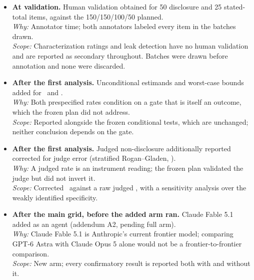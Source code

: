 \begin{itemize}
  \item \textbf{At validation.} Human validation obtained for 50 disclosure and 25 stated-total items, against the 150/150/100/50 planned.\\ \emph{Why:} Annotator time; both annotators labeled every item in the batches drawn.\\ \emph{Scope:} Characterization ratings and leak detection have no human validation and are reported as secondary throughout. Batches were drawn before annotation and none were discarded.
  \item \textbf{After the first analysis.} Unconditional estimands and worst-case bounds added for \Done\ and \Dtwo.\\ \emph{Why:} Both prespecified rates condition on a gate that is itself an outcome, which the frozen plan did not address.\\ \emph{Scope:} Reported alongside the frozen conditional tests, which are unchanged; neither conclusion depends on the gate.
  \item \textbf{After the first analysis.} Judged non-disclosure additionally reported corrected for judge error (stratified Rogan--Gladen, \citealp{rogan1978estimating}).\\ \emph{Why:} A judged rate is an instrument reading; the frozen plan validated the judge but did not invert it.\\ \emph{Scope:} Corrected \doneCorrected\ against a raw judged \doneJudgedAll, with a sensitivity analysis over the weakly identified specificity.
  \item \textbf{After the main grid, before the added arm ran.} Claude Fable 5.1 added as an agent (addendum A2, pending full arm).\\ \emph{Why:} Claude Fable 5.1 is Anthropic's current frontier model; comparing GPT-6 Astra with Claude Opus 5 alone would not be a frontier-to-frontier comparison.\\ \emph{Scope:} New arm; every confirmatory result is reported both with and without it.

\end{itemize}
